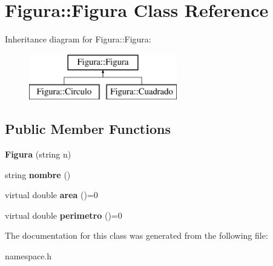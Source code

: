 \hypertarget{classFigura_1_1Figura}{\section{Figura\-:\-:Figura Class Reference}
\label{classFigura_1_1Figura}
}
Inheritance diagram for Figura\-:\-:Figura\-:\begin{figure}[H]
\begin{center}
\leavevmode
\includegraphics[height=2.000000cm]{classFigura_1_1Figura}
\end{center}
\end{figure}
\subsection*{Public Member Functions}
\begin{DoxyCompactItemize}
\item 
\hypertarget{classFigura_1_1Figura_a5fca1cc004e13574d31f7a5f3afd4039}{{\bfseries Figura} (string n)}\label{classFigura_1_1Figura_a5fca1cc004e13574d31f7a5f3afd4039}

\item 
\hypertarget{classFigura_1_1Figura_add6081ce2446a4919b106313546316ac}{string {\bfseries nombre} ()}\label{classFigura_1_1Figura_add6081ce2446a4919b106313546316ac}

\item 
\hypertarget{classFigura_1_1Figura_a72ce7658ac247e7ce85601df372129a9}{virtual double {\bfseries area} ()=0}\label{classFigura_1_1Figura_a72ce7658ac247e7ce85601df372129a9}

\item 
\hypertarget{classFigura_1_1Figura_a31f599da6f2d170b50121bd3a6bc4898}{virtual double {\bfseries perimetro} ()=0}\label{classFigura_1_1Figura_a31f599da6f2d170b50121bd3a6bc4898}

\end{DoxyCompactItemize}


The documentation for this class was generated from the following file\-:\begin{DoxyCompactItemize}
\item 
namespace.\-h\end{DoxyCompactItemize}
